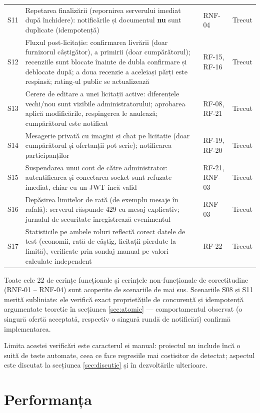 \begin{table}[!ht]
\begin{tabular}{l >{\raggedright\arraybackslash}p{9.6cm} l l}
S11 & Repetarea finalizării (repornirea serverului imediat după închidere): notificările și documentul \textbf{nu} sunt duplicate (idempotență) & RNF-04 & Trecut \\
S12 & Fluxul post-licitație: confirmarea livrării (doar furnizorul câștigător), a primirii (doar cumpărătorul); recenziile sunt blocate înainte de dubla confirmare și deblocate după; a doua recenzie a aceleiași părți este respinsă; rating-ul public se actualizează & RF-15, RF-16 & Trecut \\
S13 & Cerere de editare a unei licitații active: diferențele vechi/nou sunt vizibile administratorului; aprobarea aplică modificările, respingerea le anulează; cumpărătorul este notificat & RF-08, RF-21 & Trecut \\
S14 & Mesagerie privată cu imagini și chat pe licitație (doar cumpărătorul și ofertanții pot scrie); notificarea participanților & RF-19, RF-20 & Trecut \\
S15 & Suspendarea unui cont de către administrator: autentificarea și conectarea socket sunt refuzate imediat, chiar cu un JWT încă valid & RF-21, RNF-03 & Trecut \\
S16 & Depășirea limitelor de rată (de exemplu mesaje în rafală): serverul răspunde 429 cu mesaj explicativ; jurnalul de securitate înregistrează evenimentul & RNF-03 & Trecut \\
S17 & Statisticile pe ambele roluri reflectă corect datele de test (economii, rată de câștig, licitații pierdute la limită), verificate prin sondaj manual pe valori calculate independent & RF-22 & Trecut \\
\bottomrule
\end{tabular}
\end{table}

Toate cele 22 de cerințe funcționale și cerințele non-funcționale de corectitudine (RNF-01 -- RNF-04) sunt acoperite de scenariile de mai sus. Scenariile S08 și S11 merită subliniate: ele verifică exact proprietățile de concurență și idempotență argumentate teoretic în secțiunea \ref{sec:atomic} --- comportamentul observat (o singură ofertă acceptată, respectiv o singură rundă de notificări) confirmă implementarea.

Limita acestei verificări este caracterul ei manual: proiectul nu include încă o suită de teste automate, ceea ce face regresiile mai costisitor de detectat; aspectul este discutat la secțiunea \ref{sec:discutie} și în dezvoltările ulterioare.

\section{Performanța}

